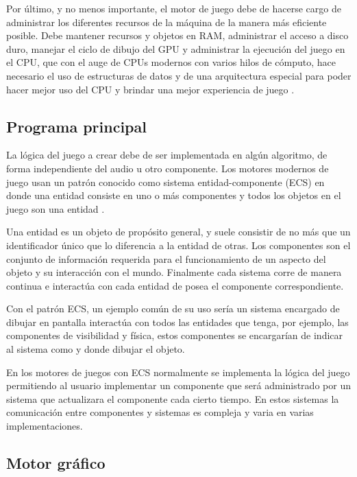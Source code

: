 Por último, y no menos importante, el motor de juego debe de hacerse cargo de administrar los diferentes recursos de la máquina de la manera más eficiente posible. Debe mantener recursos y objetos en RAM, administrar el acceso a disco duro, manejar el ciclo de dibujo del GPU y administrar la ejecución del juego en el CPU, que con el auge de CPUs modernos con varios hilos de cómputo, hace necesario el uso de estructuras de datos y de una arquitectura especial para poder hacer mejor uso del CPU y brindar una mejor experiencia de juego \cite{andrews2009designing}.

\subsection{Programa principal} \label{sec:MTlogica}

La lógica del juego a crear debe de ser implementada en algún algoritmo, de forma independiente del audio u otro componente. Los motores modernos de juego usan un patrón conocido como sistema entidad-componente (ECS) en donde una entidad consiste en uno o más componentes y todos los objetos en el juego son una entidad \cite{JasonGregory-GameEngineArchitecture}.

Una entidad es un objeto de propósito general, y suele consistir de no más que un identificador único que lo diferencia a la entidad de otras. Los componentes son el conjunto de información requerida para el funcionamiento de un aspecto del objeto y su interacción con el mundo. Finalmente cada sistema corre de manera continua e interactúa con cada entidad de posea el componente correspondiente.

Con el patrón ECS, un ejemplo común de su uso sería un sistema encargado de dibujar en pantalla interactúa con todos las entidades que tenga, por ejemplo, las componentes de visibilidad y física, estos componentes se encargarían de indicar al sistema como y donde dibujar el objeto.

En los motores de juegos con ECS normalmente se implementa la lógica del juego permitiendo al usuario implementar un componente que será administrado por un sistema que actualizara el componente cada cierto tiempo. En estos sistemas la comunicación entre componentes y sistemas es compleja y varia en varias implementaciones.

\subsection{Motor gráfico}

